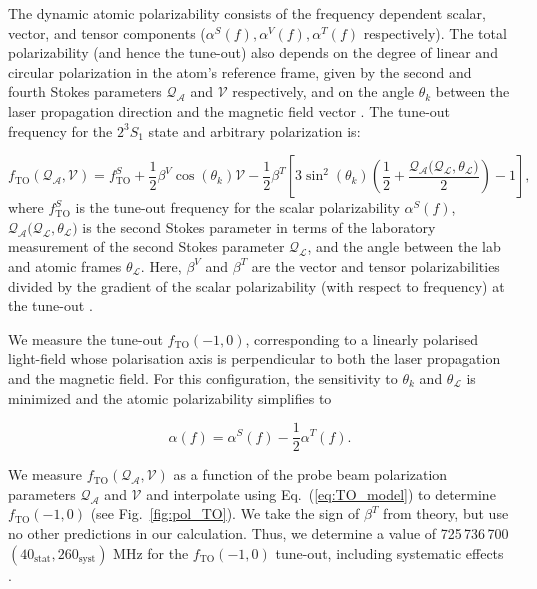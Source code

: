 \documentclass[12pt]{article}
\newcommand{\MetastableState}{2^{3\!}S_1}%
\begin{document}
The dynamic atomic polarizability consists of the frequency dependent scalar, vector, and tensor components (\(\alpha^S(f),\alpha^V(f),\alpha^T(f)\) respectively). The total polarizability (and hence the tune-out) also depends on the degree of linear and circular polarization in the atom's reference frame, given by the second and fourth Stokes parameters \(\mathcal{Q_{A}}\) and  \(\mathcal{V}\) respectively, and on the angle $\theta_k$ between the laser propagation direction and the magnetic field vector \cite{LeKien2013}. The tune-out frequency for the \(\MetastableState\) state and arbitrary polarization is: 

    \begin{equation}
    f_{\mathrm{TO}}(\mathcal{Q_{A}}, \mathcal{V}) = f^{S}_{\mathrm{TO}} + \frac{1}{2} \beta^V \cos \left( \theta_k \right) \mathcal{V}  - \frac{1}{2} \beta^T \left[3 \sin^2\left( \theta_k \right) \left(\frac{1}{2} +  \frac{\mathcal{Q_{A}(Q_{L},\theta_{L}})}{2}\right) -1 \right],
    \label{eq:TO_model}
    \end{equation}
where \(f^{S}_{\mathrm{TO}}\) is the tune-out frequency for the scalar polarizability $\alpha^S(f)$, \(\mathcal{Q_{A}(Q_{L},\theta_{L}})\) is the second Stokes parameter in terms of the laboratory measurement of the second Stokes parameter \(\mathcal{Q_L}\), and the angle between the lab and atomic frames \(\mathcal{\theta_{L}}\). Here, \( \beta^V\) and  \(\beta^T\) are the vector and tensor polarizabilities divided by the gradient of the scalar polarizability (with respect to frequency) at the tune-out \cite{SOMs}.


We measure the tune-out \(f_{\mathrm{TO}}(-1,0)\), corresponding to a linearly polarised light-field whose polarisation axis is perpendicular to both the laser propagation and the magnetic field. For this configuration, the sensitivity to \(\theta_{k}\) and \(\theta_\mathcal{L}\) is minimized and the atomic polarizability simplifies to

\begin{equation}
    \alpha(f) = \alpha^S(f) - \frac{1}{2} \alpha^T(f). 
    \label{eq:polarizability_2}
\end{equation}

We measure \(f_{\mathrm{TO}}(\mathcal{Q_{A}}, \mathcal{V}) \) as a function of the probe beam polarization parameters \(\mathcal{Q_{A}}\) and \(\mathcal{V}\) and interpolate using Eq.~(\ref{eq:TO_model}) to determine \(f_{\mathrm{TO}}(-1,0)\) (see Fig.~\ref{fig:pol_TO}). We take the sign of \(\beta^T\) from theory, but use no other predictions in our calculation. Thus, we determine a value of  725\,736\,700\,$(40_{\mathrm{stat}},260_{\mathrm{syst}})$ MHz for the \(f_{\mathrm{TO}}(-1,0)\) tune-out, including systematic effects \cite{SOMs}.
\end{document}

